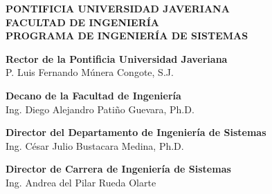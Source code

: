 \begin{center}

        \large
        \textbf{PONTIFICIA UNIVERSIDAD JAVERIANA} \\
        \textbf{FACULTAD DE INGENIERÍA} \\
        \textbf{PROGRAMA DE INGENIERÍA DE SISTEMAS} \\

        
        \vspace{0.5cm}
        \LARGE


        \vspace{8cm}

        \large
        \textbf{Rector de la Pontificia Universidad Javeriana}\\
        \vspace{0.5cm}
        P. Luis Fernando Múnera Congote, S.J.\\
        \vspace{0.5cm}
        
        \textbf{Decano de la Facultad de Ingeniería}\\
        \vspace{0.5cm}
        Ing. Diego Alejandro Patiño Guevara, Ph.D.\\
        \vspace{0.5cm}
        
        \textbf{Director del Departamento de Ingeniería de Sistemas}\\
        \vspace{0.5cm}
        Ing. César Julio Bustacara Medina, Ph.D. \\
        \vspace{0.5cm}

        \textbf{Director de Carrera de Ingeniería de Sistemas}\\
        \vspace{0.5cm}
        Ing. Andrea del Pilar Rueda Olarte \\
        
    \end{center}
